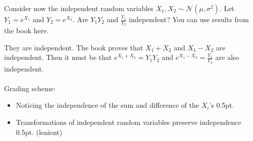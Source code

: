 \begin{exercise}[1]
Consider now the independent random variables $X_1,X_2\sim\mathcal{N}(\mu,\sigma^2)$. Let $Y_1 = e^{X_1}$ and $Y_2 = e^{X_2}$. Are $Y_1Y_2$ and $\frac{Y_1}{Y_2}$ independent? You can use results from the book here.
\begin{solution}
They are independent. The book proves that $X_1+X_2$ and $X_1-X_2$ are independent. Then it must be that $e^{X_1+X_2} = Y_1Y_2$ and $e^{X_1-X_2} = \frac{Y_1}{Y_2}$ are also independent.
\\\\
Grading scheme:
\begin{itemize}
    \item Noticing the independence of the sum and difference of the $X_i$'s 0.5pt.
    \item Transformations of independent random variables preserve independence 0.5pt. (lenient)
\end{itemize}
\end{solution}
\end{exercise}

